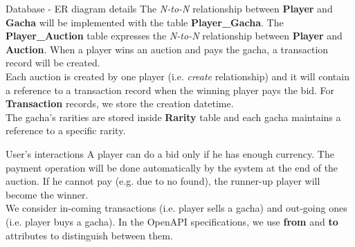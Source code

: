 \documentclass[12pt,aspectratio=169,notheorems]{beamer}
\begin{document}
\begin{frame}{Database - ER diagram details}
    The \emph{N-to-N} relationship between \textbf{Player} and \textbf{Gacha} will be implemented with the table \textbf{Player\_Gacha}. The \textbf{Player\_Auction} table expresses the \emph{N-to-N} relationship between \textbf{Player} and \textbf{Auction}. When a player wins an auction and pays the gacha, a transaction record will be created. \\[1ex]
    Each auction is created by one player (i.e. \emph{create} relationship) and it will contain a reference to a transaction record when the winning player pays the bid. For \textbf{Transaction} records, we store the creation datetime. \\[1ex]
    The gacha's rarities are stored inside \textbf{Rarity} table and each gacha maintains a reference to a specific rarity.
\end{frame}

\begin{frame}{User's interactions}
      A player can do a bid only if he has enough currency. The payment operation will be done automatically by the system at the end of the auction. If he cannot pay (e.g. due to no found), the runner-up player will become the winner. \\[1ex]
     We consider in-coming transactions (i.e. player sells a gacha) and out-going ones (i.e. player buys a gacha). In the OpenAPI specifications, we use \textbf{from} and \textbf{to} attributes to distinguish between them.
\end{frame}
\end{document}
